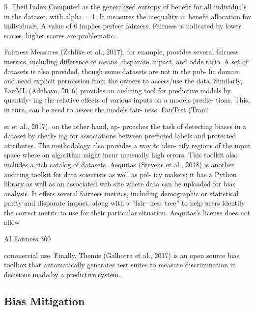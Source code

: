 \documentclass[final,5p,times,twocolumn]{elsarticle}
\begin{document}
5. Theil Index \cite{conceicao2000theyoung,bellamy2018ai}
Computed as the generalized entropy of benefit for all individuals in the dataset, with alpha = 1. It measures the inequality in benefit allocation for individuals.
A value of 0 implies perfect fairness. Fairness is indicated by lower scores, higher scores are problematic.


 Fairness Measures (Zehlike et al., 2017), for example,
provides several fairness metrics, including difference of
means, disparate impact, and odds ratio. A set of datasets
is also provided, though some datasets are not in the pub-
lic domain and need explicit permission from the owners
to access/use the data. Similarly, FairML (Adebayo, 2016)
provides an auditing tool for predictive models by quantify-
ing the relative effects of various inputs on a models predic-
tions. This, in turn, can be used to assess the models fair-
ness. FairTest (Tram`

er et al., 2017), on the other hand, ap-
proaches the task of detecting biases in a dataset by check-
ing for associations between predicted labels and protected
attributes. The methodology also provides a way to iden-
tify regions of the input space where an algorithm might
incur unusually high errors. This toolkit also includes a
rich catalog of datasets. Aequitas (Stevens et al., 2018) is
another auditing toolkit for data scientists as well as pol-
icy makers; it has a Python library as well as an associated
web site where data can be uploaded for bias analysis. It
offers several fairness metrics, including demographic or
statistical parity and disparate impact, along with a ”fair-
ness tree” to help users identify the correct metric to use for
their particular situation. Aequitas’s license does not allow


AI Fairness 360

commercial use. Finally, Themis (Galhotra et al., 2017) is
an open source bias toolbox that automatically generates
test suites to measure discrimination in decisions made by
a predictive system.

\subsection{Bias Mitigation}
\label{sec:bias_mitigation}
\end{document}
